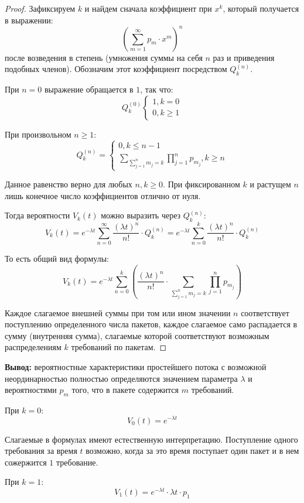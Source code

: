 \documentclass[aps,%
12pt,%
final,%
oneside,
onecolumn,%
musixtex, %
superscriptaddress,%
centertags]{article} %
\theoremstyle{plain}
\theoremstyle{definition}
\theoremstyle{remark}
\begin{document}
\begin{proof}
	Зафиксируем $k$ и найдем сначала коэффициент при $x^k$, который получается в выражении:
	$$\left( \sum\limits_{m=1}^{\infty}p_m \cdot x^m\right)^n$$
	после возведения в степень (умножения суммы на себя $n$ раз и приведения подобных членов). Обозначим этот коэффициент посредством $Q_k^{(n)}$.

	При $n=0$ выражение обращается в $1$, так что: 
	$$Q_k^{(0)}\begin{cases}
		1, k =0 \\
		0, k \geq 1
	\end{cases}$$

	При произвольном $n \geq 1$:
	$$Q_k^{(n)} = \begin{cases}
		0, k \leq n -1 \\
		\sum\limits_{\sum\limits_{j=1}^n m_j = k} \prod\limits_{j=1}^n p_{m_j}, k \geq n
	\end{cases}$$

	Данное равенство верно для любых $n, k \geq 0$. При фиксированном $k$ и растущем $n$ лишь конечное число коэффициентов отлично от нуля.

	Тогда вероятности $V_k(t)$ можно выразить через $Q_{k}^{(n)}$:
	$$V_k(t) = e^{-\lambda t}\sum\limits_{n=0}^{\infty}\frac{(\lambda t)^n}{n!} \cdot Q_{k}^{(n)} =  e^{-\lambda t}\sum\limits_{n=0}^{k}\frac{(\lambda t)^n}{n!} \cdot Q_{k}^{(n)}$$

	То есть общий вид формулы:
	$$V_k(t) = e^{-\lambda t}\sum\limits_{n=0}^{k} \left(\frac{(\lambda t)^n}{n!} \cdot \sum\limits_{\sum\limits_{j=1}^n m_j = k} \prod\limits_{j=1}^n p_{m_j}\right)$$

	Каждое слагаемое внешней суммы при том или ином значении $n$ соответствует поступлению определенного числа пакетов, каждое слагаемое само распадается в сумму (внутренняя сумма), слагаемые которой соответствуют возможным распределениям $k$ требований по пакетам.
\end{proof}

\textbf{Вывод:} вероятностные характеристики простейшего потока с возможной неординарностью полностью определяются значением параметра $\lambda$ и вероятностями $p_m$ того, что в пакете содержится $m$ требований. 

При $k=0$:
$$V_0(t) = e^{-\lambda t}$$

Слагаемые в формулах имеют естественную интерпретацию. Поступление одного требования за время $t$ возможно, когда за это время поступает один пакет и в нем сожержится $1$ требование. 

При $k=1$:
$$V_1(t) = e^{-\lambda t} \cdot \lambda t \cdot p_1$$
\end{document}
